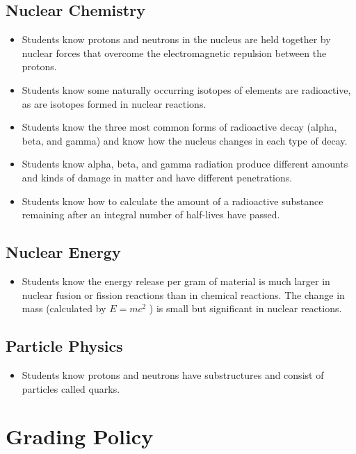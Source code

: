 \documentclass[11pt]{article}
\begin{document}
\subsection{Nuclear Chemistry}
\label{sec:org5376ae3}
\begin{itemize}
\item Students know protons and neutrons in the nucleus are held together by nuclear forces that overcome the electromagnetic repulsion between the protons.
\item Students know some naturally occurring isotopes of elements are radioactive, as are isotopes formed in nuclear reactions.
\item Students know the three most common forms of radioactive decay (alpha, beta, and gamma) and know how the nucleus changes in each type of decay.
\item Students know alpha, beta, and gamma radiation produce different amounts and kinds of damage in matter and have different penetrations.
\item Students know how to calculate the amount of a radioactive substance remaining after an integral number of half-lives have passed.
\end{itemize}
\subsection{Nuclear Energy}
\label{sec:org6f2db0e}
\begin{itemize}
\item Students know the energy release per gram of material is much larger in nuclear fusion or fission reactions than in chemical reactions. The change in mass (calculated by \(E = mc^2\) ) is small but significant in nuclear reactions.
\end{itemize}
\subsection{Particle Physics}
\label{sec:org25739da}
\begin{itemize}
\item Students know protons and neutrons have substructures and consist of particles called quarks.
\end{itemize}
\section{Grading Policy}
\label{sec:org6c2fa0b}
\end{document}
